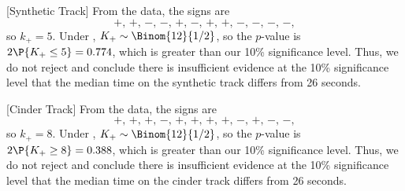 \begin{solution}
\begin{ppart}
        [Synthetic Track] From the data, the signs are \[+, \, +, \, -, \, -, \, +, \, -, \, +, \, +, \, -, \, -, \, -, \, -,\] so $k_+ = 5$. Under \nullhyp, $K_+ \sim \Binom{12}{1/2}$, so the $p$-value is $2\P{K_+ \leq 5} = 0.774$, which is greater than our 10\% significance level. Thus, we do not reject \nullhyp{} and conclude there is insufficient evidence at the 10\% significance level that the median time on the synthetic track differs from 26 seconds.

        [Cinder Track] From the data, the signs are \[+, \, +, \, +, \, -, \, +, \, +, \, +, \, +, \, -, \, +, \, -, \, -,\] so $k_+ = 8$. Under \nullhyp, $K_+ \sim \Binom{12}{1/2}$, so the $p$-value is $2\P{K_+ \geq 8} = 0.388$, which is greater than our 10\% significance level. Thus, we do not reject \nullhyp{} and conclude there is insufficient evidence at the 10\% significance level that the median time on the cinder track differs from 26 seconds.
    \end{ppart}
\end{solution}

